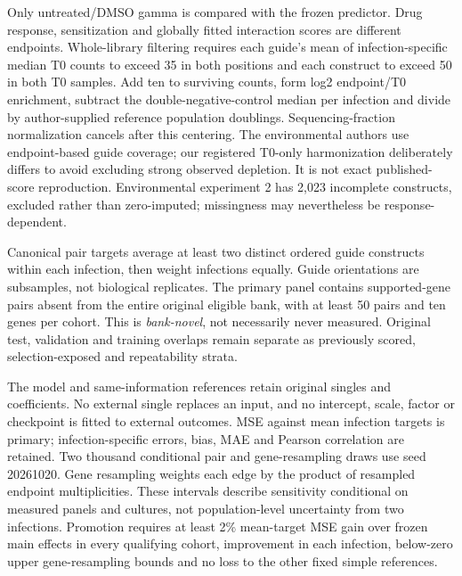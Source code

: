 Only untreated/DMSO gamma is compared with the frozen predictor. Drug response, sensitization and globally fitted interaction scores are different endpoints. Whole-library filtering requires each guide's mean of infection-specific median T0 counts to exceed 35 in both positions and each construct to exceed 50 in both T0 samples. Add ten to surviving counts, form log2 endpoint/T0 enrichment, subtract the double-negative-control median per infection and divide by author-supplied reference population doublings. Sequencing-fraction normalization cancels after this centering. The environmental authors use endpoint-based guide coverage; our registered T0-only harmonization deliberately differs to avoid excluding strong observed depletion. It is not exact published-score reproduction. Environmental experiment 2 has 2,023 incomplete constructs, excluded rather than zero-imputed; missingness may nevertheless be response-dependent.

Canonical pair targets average at least two distinct ordered guide constructs within each infection, then weight infections equally. Guide orientations are subsamples, not biological replicates. The primary panel contains supported-gene pairs absent from the entire original eligible bank, with at least 50 pairs and ten genes per cohort. This is \emph{bank-novel}, not necessarily never measured. Original test, validation and training overlaps remain separate as previously scored, selection-exposed and repeatability strata.

The model and same-information references retain original singles and coefficients. No external single replaces an input, and no intercept, scale, factor or checkpoint is fitted to external outcomes. MSE against mean infection targets is primary; infection-specific errors, bias, MAE and Pearson correlation are retained. Two thousand conditional pair and gene-resampling draws use seed 20261020. Gene resampling weights each edge by the product of resampled endpoint multiplicities. These intervals describe sensitivity conditional on measured panels and cultures, not population-level uncertainty from two infections. Promotion requires at least 2\% mean-target MSE gain over frozen main effects in every qualifying cohort, improvement in each infection, below-zero upper gene-resampling bounds and no loss to the other fixed simple references.

